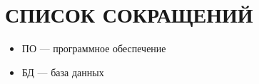 \chapter*{\hfill{\centering СПИСОК СОКРАЩЕНИЙ}\hfill}

\begin{itemize}
	\item[] ПО --- программное обеспечение
	\item[] БД --- база данных
\end{itemize}
